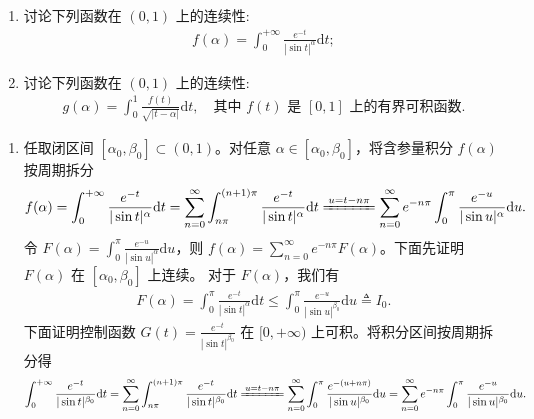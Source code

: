 \documentclass[../../main.tex]{subfiles}%
\begin{document}
\begin{example}
\begin{enumerate}[(1)]
\item 讨论下列函数在 \((0,1)\) 上的连续性:
\begin{align*}
f(\alpha) = \int_{0}^{+\infty} \frac{e^{-t}}{|\sin t|^{\alpha}} \mathrm{d}t;
\end{align*}
\item 讨论下列函数在 \((0,1)\) 上的连续性:
\begin{align*}
g(\alpha) = \int_{0}^{1} \frac{f(t)}{\sqrt{|t-\alpha|}} \mathrm{d}t, \quad \text{其中 } f(t) \text{ 是 } [0,1] \text{ 上的有界可积函数}.
\end{align*}
\end{enumerate}
\end{example}
\begin{solution}
\begin{enumerate}[(1)]
\item 任取闭区间 \([\alpha_0, \beta_0] \subset (0,1)\)。对任意 \(\alpha \in [\alpha_0, \beta_0]\)，将含参量积分 \(f(\alpha)\) 按周期拆分
\begin{align}
f(\alpha) = \int_{0}^{+\infty} \frac{e^{-t}}{|\sin t|^{\alpha}} \mathrm{d}t = \sum_{n=0}^{\infty} \int_{n\pi}^{(n+1)\pi} \frac{e^{-t}}{|\sin t|^{\alpha}} \mathrm{d}t \xlongequal{u = t - n\pi} \sum_{n=0}^{\infty} e^{-n\pi} \int_{0}^{\pi} \frac{e^{-u}}{|\sin u|^{\alpha}} \mathrm{d}u. \label{eq:series_decomp_123}
\end{align}
令 \(F(\alpha) = \int_{0}^{\pi} \frac{e^{-u}}{|\sin u|^{\alpha}} \mathrm{d}u\)，则 \(f(\alpha) = \sum_{n=0}^{\infty} e^{-n\pi} F(\alpha)\)。下面先证明 \(F(\alpha)\) 在 \([\alpha_0, \beta_0]\) 上连续。
对于 \(F(\alpha)\)，我们有
\begin{align}\label{eq::jiqjw202u80u289}
F\left( \alpha \right) =\int_0^{\pi}{\frac{e^{-t}}{|\sin t|^{\alpha}}\mathrm{d}t}\leqslant \int_0^{\pi}{\frac{e^{-u}}{|\sin u|^{\beta _0}}\mathrm{d}u}\triangleq I_0.
\end{align}
下面证明控制函数 \(G(t) = \frac{e^{-t}}{|\sin t|^{\beta_0}}\) 在 \([0,+\infty)\) 上可积。将积分区间按周期拆分得
\begin{align*}
\int_0^{+\infty}{\frac{e^{-t}}{|\sin t|^{\beta _0}}\mathrm{d}t=\sum_{n=0}^{\infty}{\int_{n\pi}^{(n+1)\pi}{\frac{e^{-t}}{|\sin t|^{\beta _0}}\mathrm{d}t}}}\xlongequal{u=t-n\pi}\sum_{n=0}^{\infty}{\int_0^{\pi}{\frac{e^{-(u+n\pi )}}{|\sin u|^{\beta _0}}\mathrm{d}u}}=\sum_{n=0}^{\infty}{e^{-n\pi}\int_0^{\pi}{\frac{e^{-u}}{|\sin u|^{\beta _0}}\mathrm{d}u.}}
\end{align*}

\end{enumerate}
\end{solution}
\end{document}
